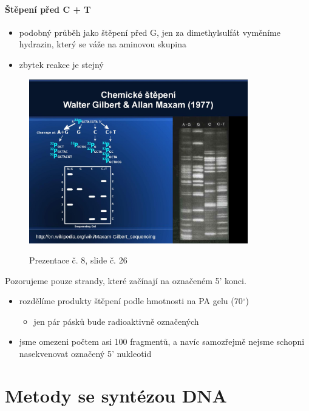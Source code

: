 \documentclass[DIV=8]{scrreprt}
\begin{document}
\paragraph{Štěpení před C + T}
\begin{itemize}[nosep]
    \item podobný průběh jako štěpení před G, jen za dimethylsulfát vyměníme hydrazin, který se váže na aminovou skupina
    \item zbytek reakce je stejný
\end{itemize}



\begin{figure}
    \caption{Prezentace č. 8, slide č. 26}
    \includegraphics[width=0.85\textwidth]{slides-8/slide-26.jpg}
    \centering
    \label{slides-8-slide-26}
\end{figure}

Pozorujeme pouze strandy, které začínají na označeném 5' konci.
\begin{itemize}[nosep]
    \item rozdělíme produkty štěpení podle hmotnosti na PA gelu (70\(^{\circ}\))
\begin{itemize}[nosep]
    \item jen pár pásků bude radioaktivně označených
\end{itemize}

    \item jsme omezeni počtem asi 100 fragmentů, a navíc samozřejmě nejsme schopni nasekvenovat označený 5' nukleotid
\end{itemize}



\section{Metody se syntézou DNA} \label{Metody se syntézou DNA}
\end{document}
